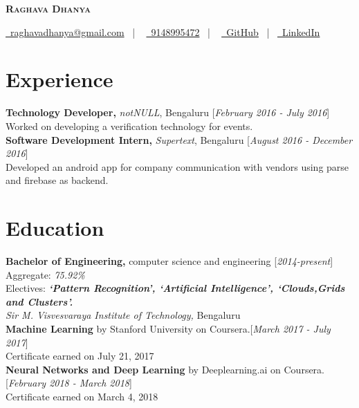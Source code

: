 \documentclass[10pt]{article}
\begin{document}
\thispagestyle{empty}

\begin{center}
 \textbf{\textsc{\color{anotherred}\Huge Raghava Dhanya}}\\[10pt] %
\end{center}

\begin{center}
 \href{mailto:raghavadhanya@gmail.com}{\faEnvelope\ raghavadhanya@gmail.com}
 \ | \ %
 \href{tel:9148995472}{\faPhoneSquare\ 9148995472} \ | \ %
 \href{https://github.com/RaghavaDhanya}{ \underline{\faGithubSquare\
 GitHub}} \ | \ \href{https://in.linkedin.com/in/raghavadhanya}{\underline
 {\faLinkedinSquare\ LinkedIn}} 
\end{center}


\section*{Experience} \textbf{Technology Developer,} \textit{notNULL},
Bengaluru \hfill [\textit{February 2016 - July 2016}]\\
Worked on developing a verification technology for events.
\medskip
\\
\textbf{Software Development Intern,} \textit{Supertext}, Bengaluru
\hfill [\textit{August 2016 - December 2016}]\\
Developed an android app for company communication with vendors using
parse and firebase as backend. 


\section*{Education} \textbf{Bachelor of Engineering,} computer science
and engineering \hfill [\textit{2014-present}]\\
Aggregate: \textit{75.92\%}\\
Electives: \textbf{\textit{`Pattern Recognition', `Artificial Intelligence',
`Clouds,Grids and Clusters'.}}\\
\textit{Sir M. Visvesvaraya Institute of Technology,} Bengaluru
\medskip
\\
\textbf{Machine Learning} by Stanford University on Coursera.\hfill [\textit
{March 2017 - July 2017}]\\
Certificate earned on July 21, 2017
\medskip\\ 
\textbf{Neural Networks and Deep Learning} by Deeplearning.ai on Coursera.\hfill [\textit
{February 2018 - March 2018}]\\
Certificate earned on March 4, 2018 
\end{document}
